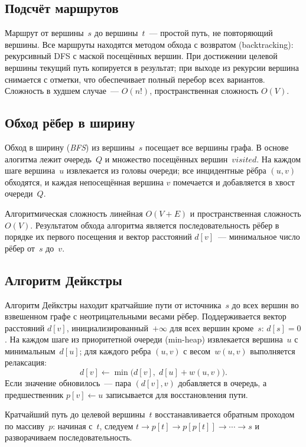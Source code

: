 \subsection{Подсчёт маршрутов}

Маршрут от вершины~$s$ до вершины~$t$~--- простой путь, не повторяющий
вершины. Все маршруты находятся методом обхода с возвратом (backtracking):
рекурсивный DFS с маской посещённых вершин. При достижении целевой вершины
текущий путь копируется в результат; при выходе из рекурсии вершина
снимается с отметки, что обеспечивает полный перебор всех вариантов.
Сложность в худшем случае~--- $O(n!)$, пространственная сложность $O(V)$.

\subsection{Обход рёбер в ширину}

Обход в ширину (\textit{BFS}) из вершины~$s$ посещает все вершины
графа. В основе алогитма лежит очередь~$Q$ и множество посещённых вершин~$\mathit{visited}$.
На каждом шаге вершина~$u$ извлекается из головы очереди; все
инцидентные рёбра $(u, v)$ обходятся, и каждая непосещённая вершина $v$
помечается и добавляется в хвост очереди~$Q$.

Алгоритмическая сложность линейная $O(V + E)$ и пространственная сложность $O(V)$. Результатом обхода алгоритма является
последовательность рёбер в порядке их первого посещения и вектор
расстояний $d[v]$~--- минимальное число рёбер от~$s$ до~$v$.

\subsection{Алгоритм Дейкстры}

Алгоритм Дейкстры находит кратчайшие пути от источника~$s$ до всех
вершин во взвешенном графе с неотрицательными весами рёбер.
Поддерживается вектор расстояний $d[v]$, инициализированный~$+\infty$
для всех вершин кроме~$s$: $d[s] = 0$. На каждом шаге из приоритетной
очереди (min-heap) извлекается вершина~$u$ с минимальным~$d[u]$;
для каждого ребра $(u, v)$ с весом~$w(u,v)$ выполняется релаксация:
\[
    d[v] \leftarrow \min\!\bigl(d[v],\; d[u] + w(u,v)\bigr).
\]
Если значение обновилось~--- пара $(d[v], v)$ добавляется в очередь,
а предшественник $p[v] \leftarrow u$ записывается для восстановления пути.

Кратчайший путь до целевой вершины~$t$ восстанавливается обратным
проходом по массиву~$p$: начиная с~$t$, следуем $t \to p[t] \to
p[p[t]] \to \cdots \to s$ и разворачиваем последовательность.

